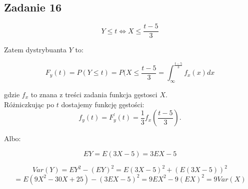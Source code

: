 \subsection{Zadanie 16}

$$ 
Y \leq t \Leftrightarrow X \leq \frac{t - 5}{3}
$$

Zatem dystrybuanta $Y$ to:

$$
F_y(t) = P(Y \leq t) = P(X \leq \frac{t-5}{3} = \int_{\infty}^{\frac{t - 5}{3}} f_x(x) dx
$$

gdzie $f_x$ to znana z treści zadania funkcja gęstosci $X$.\\
Różniczkując po $t$ dostajemy funkcję gęstości:\\

$$
f_y(t) = F^{'}_y(t) = \frac{1}{3} f_x(\frac{t - 5}{3}).
$$

Albo:

$$ 
EY = E(3X - 5) = 3EX - 5 
$$

$$
Var(Y) = EY^2 - (EY)^2 = E(3X - 5)^2 + (E(3X - 5))^2 
$$
$$
= E(9X^2 - 30X + 25) - (3EX - 5)^2 = 9EX^2 - 9(EX)^2 = 9Var(X)
$$
